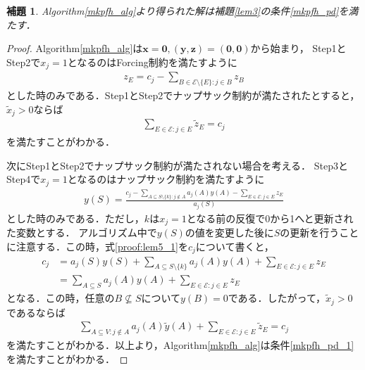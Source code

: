 \documentclass[11pt,dvipdfmx]{jarticle}
\numberwithin{equation}{section}
\newtheorem{lem}{補題}[section]
\newtheorem{proof}{証明}
\begin{document}
        \begin{lem}
            \rm Algorithm\ref{mkpfh_alg}より得られた解は補題\rm\ref{lem3}の条件\eqref{mkpfh_pd}を満たす．
            \label{lem4}
        \end{lem}
        \begin{proof}
            \rm Algorithm\ref{mkpfh_alg}は$\bm{x}=\bm{0},(\bm{y},\bm{z})=(\bm{0},\bm{0})$から始まり，
            Step1とStep2で$x_j=1$となるのはForcing制約を満たすように
            \begin{align}            
                z_E=c_j - \sum_{B\in \mathcal{E}\setminus\{E\}:j\in B}{z_B}
            \end{align}    
            とした時のみである．Step1とStep2でナップサック制約が満たされたとすると，$\tilde{x}_j>0$ならば
            \begin{align}
                \sum_{E\in\mathcal{E}:j\in E}{\tilde{z}_E}=c_j
            \end{align}
            を満たすことがわかる．\par
            次にStep1とStep2でナップサック制約が満たされない場合を考える．
            Step3とStep4で$x_j=1$となるのはナップサック制約を満たすように
            \begin{align}
                y(S)=\frac{c_j-\sum_{A\subseteq S\setminus\{k\}:j\notin A}{a_j(A)y(A)}-\sum_{E\in\mathcal{E}:j\in E}{z_E}}{a_j(S)}\label{proof:lem4_1}
            \end{align}
            とした時のみである．ただし，$k$は$x_j=1$となる前の反復で0から1へと更新された変数とする．
            アルゴリズム中で$y(S)$の値を変更した後に$S$の更新を行うことに注意する．この時，式\eqref{proof:lem5_1}を$c_j$について書くと，
            \begin{align}
                c_j &= a_j(S)y(S) + \sum_{A\subseteq S\setminus\{k\}}{a_j(A)y(A)} + \sum_{E\in\mathcal{E}:j\in E}{z_E}\\
                    &= \sum_{A\subseteq S}{a_j(A)y(A)} + \sum_{E\in\mathcal{E}:j\in E}{z_E}
            \end{align}
            となる．この時，任意の$B\not\subseteq S$について$y(B)=0$である．したがって，$\tilde{x}_j>0$であるならば
            \begin{align}
            \sum_{A\subseteq V:j\notin A}{a_j(A)\tilde{y}(A)}+\sum_{E\in \mathcal{E}: j\in E}{\tilde{z}_E}=c_j
            \end{align}
            を満たすことがわかる．以上より，Algorithm\ref{mkpfh_alg}は条件\eqref{mkpfh_pd_1}を満たすことがわかる．\par

\end{proof}
\end{document}

